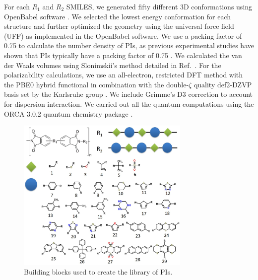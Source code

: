 For each $R_1$ and $R_2$ SMILES, we generated fifty different 3D conformations using OpenBabel software \cite{OBoyle2011}. We selected the lowest energy conformation for each structure and further optimized the geometry using the universal force field (UFF) \cite{Rappe1992} as implemented in the OpenBabel software. We use a packing factor of 0.75 to calculate the number density of PIs, as previous experimental studies have shown that PIs typically have a packing factor of 0.75 \cite{Privalko1997}. 
We calculated the van der Waals volumes using Slonimskii's method detailed in Ref.\ \cite{Slonimskii1970}. For the polarizability calculations, we use an all-electron, restricted DFT method with the PBE0 hybrid functional \cite{Adamo1999} in combination with the double-$\zeta$ quality def2-DZVP basis set by the Karlsruhe group \cite{Weigend2005}. We include Grimme's D3 correction \cite{Grimme2010} to account for dispersion interaction. We carried out all the quantum computations using the ORCA 3.0.2 quantum chemistry package \cite{Neese2012}. 


\begin{figure}[htbp] 
	\centering
	\includegraphics[width=0.744\textwidth]{Chapter-5/Figures/Building_blocks.eps}
	\caption{Building blocks used to create the library of PIs.} 
	\label{fig:Building_blocks} 
\end{figure} 

